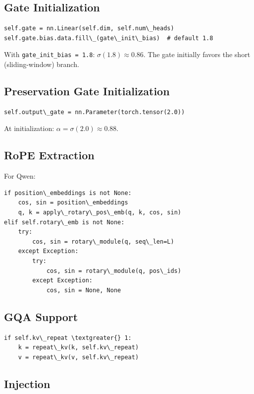 \subsection{Gate Initialization}

\begin{lstlisting}
self.gate = nn.Linear(self.dim, self.num\_heads)
self.gate.bias.data.fill\_(gate\_init\_bias)  # default 1.8
\end{lstlisting}

With \texttt{gate\_init\_bias = 1.8}: $\sigma(1.8) \approx 0.86$. The gate initially 
favors the short (sliding-window) branch.

\subsection{Preservation Gate Initialization}

\begin{lstlisting}
self.output\_gate = nn.Parameter(torch.tensor(2.0))
\end{lstlisting}

At initialization: $\alpha = \sigma(2.0) \approx 0.88$.

\subsection{RoPE Extraction}

For Qwen:

\begin{lstlisting}
if position\_embeddings is not None:
    cos, sin = position\_embeddings
    q, k = apply\_rotary\_pos\_emb(q, k, cos, sin)
elif self.rotary\_emb is not None:
    try:
        cos, sin = rotary\_module(q, seq\_len=L)
    except Exception:
        try:
            cos, sin = rotary\_module(q, pos\_ids)
        except Exception:
            cos, sin = None, None
\end{lstlisting}

\subsection{GQA Support}

\begin{lstlisting}
if self.kv\_repeat \textgreater{} 1:
    k = repeat\_kv(k, self.kv\_repeat)
    v = repeat\_kv(v, self.kv\_repeat)
\end{lstlisting}

\subsection{Injection}

